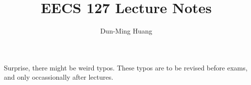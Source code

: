 \documentclass[openany]{book}
\title{EECS 127 Lecture Notes}
\author{Dun-Ming Huang}
\begin{document}
\maketitle
\setcounter{tocdepth}{1}
Surprise, there might be weird typos.
These typos are to be revised before exams, and only occassionally after lectures.
\tableofcontents

\newpage

\newpage

\newpage

\newpage

\newpage

\newpage

\newpage

\newpage

\newpage

\end{document}
